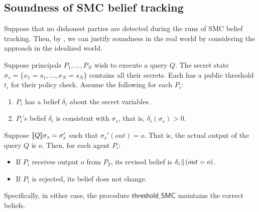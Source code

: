 \documentclass[10pt]{sigplanconf}
\begin{document}
\subsection{Soundness of SMC belief tracking}
Suppose that no dishonest parties are detected during the runs of SMC
belief tracking.  Then, by ,
we can justify soundness in the real world by considering the approach in
the idealized world.

\begin{lemma}
\label{lem:sound-smc}
Suppose principals $P_1, ..., P_N$ wish to execute a query $Q$.  The
secret state $\sigma_s = \{ x_1 = s_1, ..., x_N = s_N \}$ contains all
their secrets. Each has a public threshold $ t_i $ for their policy
check.
Assume the following for each $P_i$:
\begin{enumerate}
\item $ P_i $ has a belief $ \delta_i $ about the secret variables.
\item $ P_i $'s belief $ \delta_i $ is consistent with $ \sigma_s $, that is,
$\delta_i(\sigma_s) > 0 $.
\end{enumerate}
Suppose $[\![{Q}]\!]{\sigma_s} = \sigma_s'$ such that $\sigma_s'(out) =
o$. That is, the actual output of the query $Q$ is
$o$. Then, for each agent $ P_i $:
\begin{itemize}
\item{} If $P_i$ receives output $ o $ from $ P_T $, its revised
  belief is $ \delta_i\!\parallel\!{(out = o)} $.
\item{} If $P_i$ is rejected, its belief does not change.
\end{itemize}
Specifically, in either case, the procedure
$ \mathsf{threshold\_{SMC}} $ maintains the correct beliefs.
\end{lemma}
\end{document}
